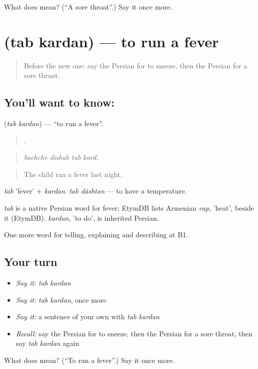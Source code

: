 \begin{tcolorbox}[breakable,colback=teal!4,colframe=teal!35!black,title={Before you move on}]
What does  mean? (\textquotedblleft{}A sore throat\textquotedblright{}.) Say it once more.
\end{tcolorbox}
\section[\texorpdfstring{\fa{تب} \fa{کردن} (tab kardan)}{تب کردن (tab kardan)}]{  (tab kardan) — to run a fever}

\label{lesson:FA-C490-tab-kardan}



\begin{quote}
Before the new one: say the Persian for to sneeze, then the Persian for a sore throat.
\end{quote}

\subsection*{You'll want to know:  }
\textbf{ } (\emph{tab kardan}) — \textquotedblleft{}to run a fever\textquotedblright{}.

\begin{quote}
   .
\end{quote}

\begin{quote}
\emph{bachche dishab tab kard.}
\end{quote}

\begin{quote}
The child ran a fever last night.
\end{quote}

\emph{tab} 'fever' + \emph{kardan}. \emph{tab dâshtan} — to have a temperature.

\begin{cousinweb}
\emph{tab} is a native Persian word for fever; EtymDB lists Armenian \emph{vap}, 'heat', beside it (EtymDB). \emph{kardan}, 'to do', is inherited Persian.
\end{cousinweb}

\begin{grammarlens}[title={What you've built}]
One more word for telling, explaining and describing at B1.
\end{grammarlens}

\subsection*{Your turn}
\begin{itemize}
\raggedright
  \item \emph{Say it:} \emph{tab kardan}
  \item \emph{Say it:} \emph{tab kardan}, once more
  \item \emph{Say it:} a sentence of your own with \emph{tab kardan}
  \item \emph{Recall:} say the Persian for to sneeze, then the Persian for a sore throat, then say \emph{tab kardan} again
\end{itemize}

\begin{tcolorbox}[breakable,colback=teal!4,colframe=teal!35!black,title={Before you move on}]
What does   mean? (\textquotedblleft{}To run a fever\textquotedblright{}.) Say it once more.
\end{tcolorbox}
